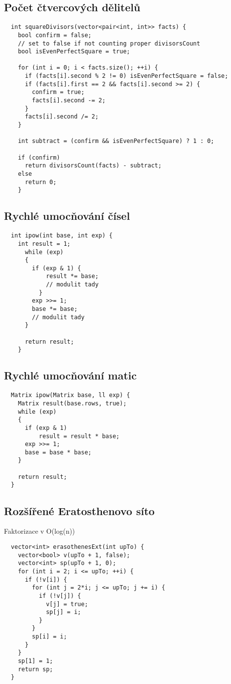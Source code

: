 \documentclass{article}
\begin{document}
\subsection{Počet čtvercových dělitelů}
\begin{lstlisting}
  int squareDivisors(vector<pair<int, int>> facts) {
    bool confirm = false;
    // set to false if not counting proper divisorsCount
    bool isEvenPerfectSquare = true;

    for (int i = 0; i < facts.size(); ++i) {
      if (facts[i].second % 2 != 0) isEvenPerfectSquare = false;
      if (facts[i].first == 2 && facts[i].second >= 2) {
        confirm = true;
        facts[i].second -= 2;
      }
      facts[i].second /= 2;
    }

    int subtract = (confirm && isEvenPerfectSquare) ? 1 : 0;

    if (confirm)
      return divisorsCount(facts) - subtract;
    else
      return 0;
    }
\end{lstlisting}

\subsection{Rychlé umocňování čísel}
\begin{lstlisting}
  int ipow(int base, int exp) {
    int result = 1;
      while (exp)
      {
        if (exp & 1) {
            result *= base;
            // modulit tady
          }
        exp >>= 1;
        base *= base;
        // modulit tady
      }

      return result;
    }
\end{lstlisting}

\subsection{Rychlé umocňování matic}
\begin{lstlisting}
  Matrix ipow(Matrix base, ll exp) {
    Matrix result(base.rows, true);
    while (exp)
    {
      if (exp & 1)
          result = result * base;
      exp >>= 1;
      base = base * base;
    }

    return result;
  }
\end{lstlisting}

\subsection{Rozšířené Eratosthenovo síto}
Faktorizace v O(log(n))
\begin{lstlisting}
  vector<int> erasothenesExt(int upTo) {
    vector<bool> v(upTo + 1, false);
    vector<int> sp(upTo + 1, 0);
    for (int i = 2; i <= upTo; ++i) {
      if (!v[i]) {
        for (int j = 2*i; j <= upTo; j += i) {
          if (!v[j]) {
            v[j] = true;
            sp[j] = i;
          }
        }
        sp[i] = i;
      }
    }
    sp[1] = 1;
    return sp;
  }
\end{lstlisting}
\end{document}
